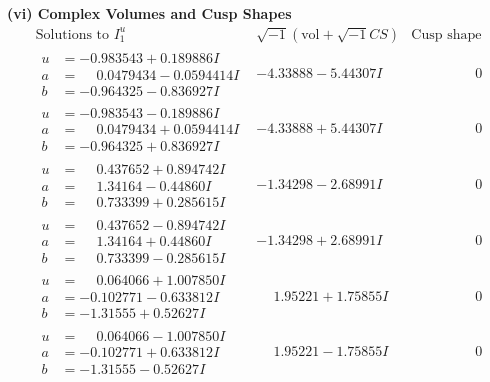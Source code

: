\documentclass[1p]{elsarticle_modified}
\theoremstyle{definition}
\newcommand{\I}{\sqrt{-1}}
\begin{document}
\newpage\flushleft \textbf{(vi) Complex Volumes and Cusp Shapes}
$$\begin{array}{c|c|c}  
\text{Solutions to }I^u_{1}& \I (\text{vol} + \sqrt{-1}CS) & \text{Cusp shape}\\
 \hline 
\begin{aligned}
u &= -0.983543 + 0.189886 I \\
a &= \phantom{-}0.0479434 - 0.0594414 I \\
b &= -0.964325 - 0.836927 I\end{aligned}
 & -4.33888 - 5.44307 I & \phantom{-0.000000 } 0 \\ \hline\begin{aligned}
u &= -0.983543 - 0.189886 I \\
a &= \phantom{-}0.0479434 + 0.0594414 I \\
b &= -0.964325 + 0.836927 I\end{aligned}
 & -4.33888 + 5.44307 I & \phantom{-0.000000 } 0 \\ \hline\begin{aligned}
u &= \phantom{-}0.437652 + 0.894742 I \\
a &= \phantom{-}1.34164 - 0.44860 I \\
b &= \phantom{-}0.733399 + 0.285615 I\end{aligned}
 & -1.34298 - 2.68991 I & \phantom{-0.000000 } 0 \\ \hline\begin{aligned}
u &= \phantom{-}0.437652 - 0.894742 I \\
a &= \phantom{-}1.34164 + 0.44860 I \\
b &= \phantom{-}0.733399 - 0.285615 I\end{aligned}
 & -1.34298 + 2.68991 I & \phantom{-0.000000 } 0 \\ \hline\begin{aligned}
u &= \phantom{-}0.064066 + 1.007850 I \\
a &= -0.102771 - 0.633812 I \\
b &= -1.31555 + 0.52627 I\end{aligned}
 & \phantom{-}1.95221 + 1.75855 I & \phantom{-0.000000 } 0 \\ \hline\begin{aligned}
u &= \phantom{-}0.064066 - 1.007850 I \\
a &= -0.102771 + 0.633812 I \\
b &= -1.31555 - 0.52627 I\end{aligned}
 & \phantom{-}1.95221 - 1.75855 I & \phantom{-0.000000 } 0 \\ \hline\begin{aligned}

\end{aligned}
\end{array}$$
\end{document}
